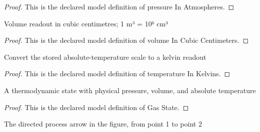 \begin{proof}
  This is the declared model definition of pressure In Atmospheres.
\end{proof}
\begin{definition}
  \label{def:physics:phyx-mini-0363:phyxminiproblems-problemphyxmini0363-volumeincubiccentimeters}
  Volume readout in cubic centimetres; 1 m³ = 10⁶ cm³
\end{definition}
\begin{proof}
  This is the declared model definition of volume In Cubic Centimeters.
\end{proof}
\begin{definition}
  \label{def:physics:phyx-mini-0363:phyxminiproblems-problemphyxmini0363-temperatureinkelvins}
  Convert the stored absolute-temperature scale to a kelvin readout
\end{definition}
\begin{proof}
  This is the declared model definition of temperature In Kelvins.
\end{proof}
\begin{definition}
  \label{def:physics:phyx-mini-0363:phyxminiproblems-problemphyxmini0363-gasstate}
  A thermodynamic state with physical pressure, volume, and absolute temperature
\end{definition}
\begin{proof}
  This is the declared model definition of Gas State.
\end{proof}
\begin{definition}
  \label{def:physics:phyx-mini-0363:phyxminiproblems-problemphyxmini0363-directedgasprocess}
  The directed process arrow in the figure, from point 1 to point 2
\end{definition}
